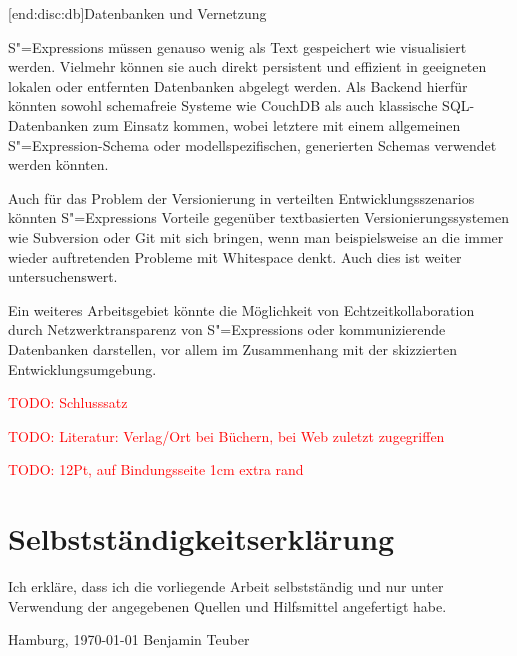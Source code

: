 \documentclass[11pt, a4paper, bibgerm]{scrbook}
\newcommand{\todo}[1]{
  \textcolor{red}{TODO: #1}
}
\newcommand\lsubsection{}
\newcommand{\sexp}{S"=Expression}
\newcommand{\sexps}{S"=Expressions}
\begin{document}
\lsubsection[end:disc:db]{Datenbanken und Vernetzung}

\sexps{} müssen genauso wenig als Text gespeichert wie visualisiert
werden. Vielmehr können sie auch direkt persistent und effizient in
geeigneten lokalen oder entfernten Datenbanken abgelegt werden. Als
Backend hierfür könnten sowohl schemafreie Systeme wie
CouchDB \cite{CouchDB} als auch klassische SQL-Datenbanken zum Einsatz
kommen, wobei letztere mit einem allgemeinen \sexp{}-Schema oder
modellspezifischen, generierten Schemas verwendet werden könnten.

Auch für das Problem der Versionierung in verteilten
Entwicklungsszenarios könnten \sexps{} Vorteile gegenüber textbasierten
Versionierungssystemen wie Subversion \cite{Svn} oder Git \cite{Git} mit
sich bringen, wenn man beispielsweise an die immer wieder auftretenden
Probleme mit Whitespace denkt. Auch dies ist weiter untersuchenswert.

Ein weiteres Arbeitsgebiet könnte die Möglichkeit von
Echtzeitkollaboration durch Netzwerktransparenz von \sexps{}
oder kommunizierende Datenbanken darstellen, vor allem im Zusammenhang
mit der skizzierten Entwicklungsumgebung.

\medskip{} 
\todo{Schlusssatz}
\todo{Literatur: Verlag/Ort bei Büchern, bei Web zuletzt zugegriffen}
\todo{12Pt, auf Bindungsseite 1cm extra rand}


\cleardoublepage





\listoffigures
{}

\chapter*{Selbstständigkeitserklärung}

Ich erkläre, dass ich die vorliegende Arbeit selbstständig und nur unter
Verwendung der angegebenen Quellen und Hilfsmittel angefertigt habe.
\vskip 2cm
\begin{flushright}
Hamburg, \today
\vskip 1cm
Benjamin Teuber
\end{flushright}
\end{document}
